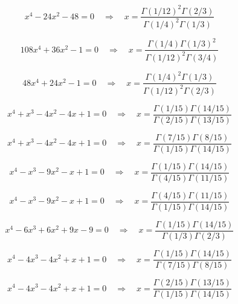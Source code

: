 \documentclass[11pt,a4paper]{article}
\begin{document}
\begin{equation}\label{eq:97}
x^{4} - 24x^{2} - 48 = 0 \quad \Rightarrow \quad x = \frac{\Gamma(1/12)^2\Gamma(2/3)}{\Gamma(1/4)^2\Gamma(1/3)}
\end{equation}

\begin{equation}\label{eq:98}
108x^{4} + 36x^{2} - 1 = 0 \quad \Rightarrow \quad x = \frac{\Gamma(1/4)\Gamma(1/3)^2}{\Gamma(1/12)^2\Gamma(3/4)}
\end{equation}

\begin{equation}\label{eq:99}
48x^{4} + 24x^{2} - 1 = 0 \quad \Rightarrow \quad x = \frac{\Gamma(1/4)^2\Gamma(1/3)}{\Gamma(1/12)^2\Gamma(2/3)}
\end{equation}

\begin{equation}\label{eq:100}
x^{4} + x^{3} - 4x^{2} - 4x + 1 = 0 \quad \Rightarrow \quad x = \frac{\Gamma(1/15)\Gamma(14/15)}{\Gamma(2/15)\Gamma(13/15)}
\end{equation}

\begin{equation}\label{eq:101}
x^{4} + x^{3} - 4x^{2} - 4x + 1 = 0 \quad \Rightarrow \quad x = \frac{\Gamma(7/15)\Gamma(8/15)}{\Gamma(1/15)\Gamma(14/15)}
\end{equation}

\begin{equation}\label{eq:102}
x^{4} - x^{3} - 9x^{2} - x + 1 = 0 \quad \Rightarrow \quad x = \frac{\Gamma(1/15)\Gamma(14/15)}{\Gamma(4/15)\Gamma(11/15)}
\end{equation}

\begin{equation}\label{eq:103}
x^{4} - x^{3} - 9x^{2} - x + 1 = 0 \quad \Rightarrow \quad x = \frac{\Gamma(4/15)\Gamma(11/15)}{\Gamma(1/15)\Gamma(14/15)}
\end{equation}

\begin{equation}\label{eq:104}
x^{4} - 6x^{3} + 6x^{2} + 9x - 9 = 0 \quad \Rightarrow \quad x = \frac{\Gamma(1/15)\Gamma(14/15)}{\Gamma(1/3)\Gamma(2/3)}
\end{equation}

\begin{equation}\label{eq:105}
x^{4} - 4x^{3} - 4x^{2} + x + 1 = 0 \quad \Rightarrow \quad x = \frac{\Gamma(1/15)\Gamma(14/15)}{\Gamma(7/15)\Gamma(8/15)}
\end{equation}

\begin{equation}\label{eq:106}
x^{4} - 4x^{3} - 4x^{2} + x + 1 = 0 \quad \Rightarrow \quad x = \frac{\Gamma(2/15)\Gamma(13/15)}{\Gamma(1/15)\Gamma(14/15)}
\end{equation}
\end{document}
